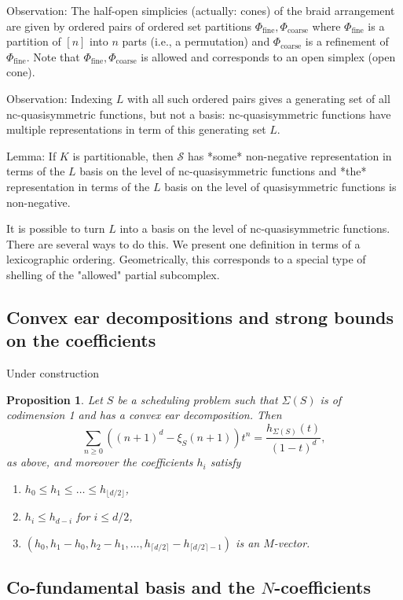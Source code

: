 \documentclass[12pt,reqno]{amsart}
\numberwithin{definition}{section}
\newtheorem{proposition}[definition]{Proposition}
\theoremstyle{definition}
\newcommand{\SSS}{\mathcal{S}}
\newcommand{\floor}[1]{\lfloor {#1} \rfloor}
\newcommand{\ceil}[1]{\lceil {#1} \rceil}
\newcommand{\comment}[1]{\textsf{\footnotesize #1}}
\begin{document}
Observation: The half-open simplicies (actually: cones) of the braid arrangement are given by ordered pairs of ordered set partitions $\Phi_{\text{fine}},\Phi_{\text{coarse}}$ where $\Phi_{\text{fine}}$ is a partition of $[n]$ into $n$ parts (i.e., a permutation) and $\Phi_{\text{coarse}}$ is a refinement of $\Phi_{\text{fine}}$. Note that $\Phi_{\text{fine}},\Phi_{\text{coarse}}$ is allowed and corresponds to an open simplex (open cone).

Observation: Indexing $L$ with all such ordered pairs gives a generating set of all nc-quasisymmetric functions, but not a basis: nc-quasisymmetric functions have multiple representations in term of this generating set $L$.

Lemma: If $K$ is partitionable, then $\SSS$ has *some* non-negative representation in terms of the $L$ basis on the level of nc-quasisymmetric functions and *the* representation in terms of the $L$ basis on the level of quasisymmetric functions is non-negative.

It is possible to turn $L$ into a basis on the level of nc-quasisymmetric functions. There are several ways to do this. We present one definition in terms of a lexicographic ordering. Geometrically, this corresponds to a special type of shelling of the "allowed" partial subcomplex.

\subsection{Convex ear decompositions and strong bounds on the coefficients}

\comment{Under construction}

\begin{proposition}
Let $S$ be a scheduling problem such that $\Sigma(S)$ is of codimension 1 and has a convex ear decomposition. Then 
\[
  \sum_{n \geq 0} ((n+1)^d - \xi_S(n+1)) t^n = \frac{h_{\Sigma(S)}(t)}{(1-t)^d},
\]
as above, and moreover the coefficients $h_i$ satisfy
\begin{enumerate}
\item $h_0 \leq h_1 \leq \ldots \leq h_{\floor{d/2}}$,
\item $h_i\leq h_{d-i}$ for $i\leq d/2$,
\item $(h_0,h_1-h_0,h_2-h_1,\ldots,h_{\ceil{d/2}}-h_{\ceil{d/2}-1})$ is an $M$-vector.
\end{enumerate}
\end{proposition}

\subsection{Co-fundamental basis and the $N$-coefficients}
\end{document}
